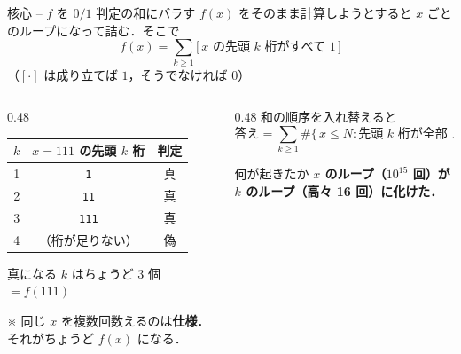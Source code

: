 \documentclass[dvipdfmx,aspectratio=169]{beamer}
\begin{document}
\begin{frame}{核心 -- $f$ を $0/1$ 判定の和にバラす}
  $f(x)$ をそのまま計算しようとすると $x$ ごとのループになって詰む．そこで
  \[
    \boxed{\ f(x) = \sum_{k \ge 1} \bigl[\,x \text{ の先頭 } k \text{ 桁がすべて } 1\,\bigr]\ }
  \]
  （$[\cdot]$ は成り立てば $1$，そうでなければ $0$）

  \vspace{0.1em}
  \begin{columns}
    \begin{column}{0.48\textwidth}
      \centering
      {\small
      \begin{tabular}{ccc}
        \toprule
        $k$ & $x=111$ の先頭 $k$ 桁 & 判定\\
        \midrule
        1 & \texttt{1}   & \textcolor{ok}{真}\\
        2 & \texttt{11}  & \textcolor{ok}{真}\\
        3 & \texttt{111} & \textcolor{ok}{真}\\
        4 & （桁が足りない） & \textcolor{ng}{偽}\\
        \bottomrule
      \end{tabular}}

      \vspace{0.3em}
      {\small 真になる $k$ はちょうど $3$ 個 $= f(111)$}

      \vspace{0.2em}
      {\scriptsize ※ 同じ $x$ を複数回数えるのは\textbf{仕様}．\\
      それがちょうど $f(x)$ になる．}
    \end{column}
    \begin{column}{0.48\textwidth}
      和の順序を入れ替えると
      \[
        \text{答え} = \sum_{k \ge 1} \#\{\,x \le N : \text{先頭 } k \text{ 桁が全部 } 1\,\}
      \]

      \vspace{0.3em}
      \begin{block}{何が起きたか}
        \textbf{$x$ のループ（$10^{15}$ 回）が\\
        $k$ のループ（高々 16 回）に化けた．}
      \end{block}
    \end{column}
  \end{columns}
\end{frame}
\end{document}
